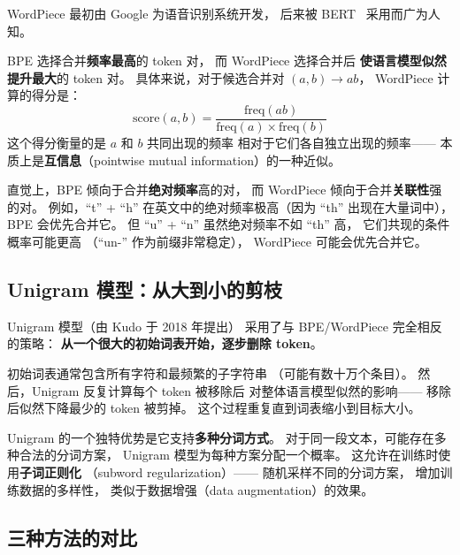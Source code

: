 WordPiece 最初由 Google 为语音识别系统开发，
后来被 BERT~\cite{devlin2019bert} 采用而广为人知。

BPE 选择合并\textbf{频率最高}的 token 对，
而 WordPiece 选择合并后
\textbf{使语言模型似然提升最大}的 token 对。
具体来说，对于候选合并对 $(a, b) \to ab$，
WordPiece 计算的得分是：
\begin{equation}
  \text{score}(a, b) = \frac{\text{freq}(ab)}{\text{freq}(a) \times \text{freq}(b)}
\end{equation}
这个得分衡量的是 $a$ 和 $b$ 共同出现的频率
相对于它们各自独立出现的频率——
本质上是\textbf{互信息}（pointwise mutual information）的一种近似。

直觉上，BPE 倾向于合并\textbf{绝对频率}高的对，
而 WordPiece 倾向于合并\textbf{关联性}强的对。
例如，``t'' + ``h'' 在英文中的绝对频率极高（因为 ``th'' 出现在大量词中），
BPE 会优先合并它。
但 ``u'' + ``n'' 虽然绝对频率不如 ``th'' 高，
它们共现的条件概率可能更高
（``un-'' 作为前缀非常稳定），
WordPiece 可能会优先合并它。

\subsection{Unigram 模型：从大到小的剪枝}

Unigram 模型（由 Kudo 于 2018 年提出）
采用了与 BPE/WordPiece 完全相反的策略：
\textbf{从一个很大的初始词表开始，逐步删除 token}。

初始词表通常包含所有字符和最频繁的子字符串
（可能有数十万个条目）。
然后，Unigram 反复计算每个 token 被移除后
对整体语言模型似然的影响——
移除后似然下降最少的 token 被剪掉。
这个过程重复直到词表缩小到目标大小。

Unigram 的一个独特优势是它支持\textbf{多种分词方式}。
对于同一段文本，可能存在多种合法的分词方案，
Unigram 模型为每种方案分配一个概率。
这允许在训练时使用\textbf{子词正则化}
（subword regularization）——
随机采样不同的分词方案，
增加训练数据的多样性，
类似于数据增强（data augmentation）的效果。

\subsection{三种方法的对比}

